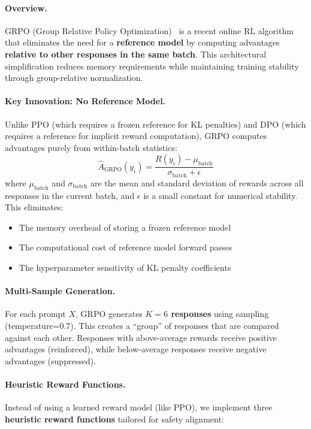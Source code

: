 \paragraph{Overview.} GRPO (Group Relative Policy Optimization)~\cite{shao2024deepseekmath} is a recent online RL algorithm that eliminates the need for a \textbf{reference model} by computing advantages \textbf{relative to other responses in the same batch}. This architectural simplification reduces memory requirements while maintaining training stability through group-relative normalization.

\paragraph{Key Innovation: No Reference Model.} Unlike PPO (which requires a frozen reference for KL penalties) and DPO (which requires a reference for implicit reward computation), GRPO computes advantages purely from within-batch statistics:
\begin{equation*}
    \hat{A}_{\text{GRPO}}(y_i) = \frac{R(y_i) - \mu_{\text{batch}}}{\sigma_{\text{batch}} + \epsilon}
\end{equation*}
where $\mu_{\text{batch}}$ and $\sigma_{\text{batch}}$ are the mean and standard deviation of rewards across all responses in the current batch, and $\epsilon$ is a small constant for numerical stability. This eliminates:
\begin{itemize}[leftmargin=*]
    \item The memory overhead of storing a frozen reference model
    \item The computational cost of reference model forward passes
    \item The hyperparameter sensitivity of KL penalty coefficients
\end{itemize}

\paragraph{Multi-Sample Generation.} For each prompt $X$, GRPO generates \textbf{$K=6$ responses} using sampling (temperature=0.7). This creates a ``group'' of responses that are compared against each other. Responses with above-average rewards receive positive advantages (reinforced), while below-average responses receive negative advantages (suppressed).

\paragraph{Heuristic Reward Functions.} Instead of using a learned reward model (like PPO), we implement three \textbf{heuristic reward functions} tailored for safety alignment:

